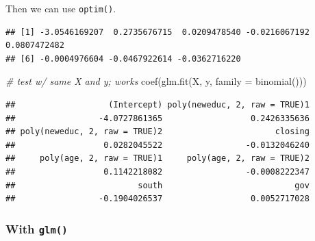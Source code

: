 \documentclass[
]{book}
\newenvironment{Shaded}{\begin{snugshade}}{\end{snugshade}}
\newcommand{\AttributeTok}[1]{\textcolor[rgb]{0.77,0.63,0.00}{#1}}
\newcommand{\CommentTok}[1]{\textcolor[rgb]{0.56,0.35,0.01}{\textit{#1}}}
\newcommand{\DecValTok}[1]{\textcolor[rgb]{0.00,0.00,0.81}{#1}}
\newcommand{\FunctionTok}[1]{\textcolor[rgb]{0.00,0.00,0.00}{#1}}
\newcommand{\NormalTok}[1]{#1}
\newcommand{\OtherTok}[1]{\textcolor[rgb]{0.56,0.35,0.01}{#1}}
\newcommand{\SpecialCharTok}[1]{\textcolor[rgb]{0.00,0.00,0.00}{#1}}
\begin{document}
Then we can use \texttt{optim()}.

\begin{Shaded}
\end{Shaded}

\begin{verbatim}
## [1] -3.0546169207  0.2735676715  0.0209478540 -0.0216067192  0.0807472482
## [6] -0.0004976604 -0.0467922614 -0.0362716220
\end{verbatim}

\begin{Shaded}
\begin{Highlighting}[]
\CommentTok{\# test w/ same X and y; works}
\FunctionTok{coef}\NormalTok{(}\FunctionTok{glm.fit}\NormalTok{(X, y, }\AttributeTok{family =} \FunctionTok{binomial}\NormalTok{()))}
\end{Highlighting}
\end{Shaded}

\begin{verbatim}
##                   (Intercept) poly(neweduc, 2, raw = TRUE)1 
##                 -4.0727861365                  0.2426335636 
## poly(neweduc, 2, raw = TRUE)2                       closing 
##                  0.0282045522                 -0.0132046240 
##     poly(age, 2, raw = TRUE)1     poly(age, 2, raw = TRUE)2 
##                  0.1142218082                 -0.0008222347 
##                         south                           gov 
##                 -0.1904026537                  0.0052717028
\end{verbatim}

\hypertarget{with-glm}{%
\subsubsection{\texorpdfstring{With
\texttt{glm()}}{With glm()}}\label{with-glm}}
\end{document}
